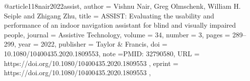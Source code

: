 @article{118nair2022assist,
author = {Vishnu Nair, Greg Olmschenk, William H. Seiple and Zhigang Zhu},
title = {ASSIST: Evaluating the usability and performance of an indoor navigation assistant for blind and visually impaired people},
journal = {Assistive Technology},
volume = {34},
number = {3},
pages = {289--299},
year = {2022},
publisher = {Taylor \& Francis},
doi = {10.1080/10400435.2020.1809553},
note ={PMID: 32790580},
URL = { https://doi.org/10.1080/10400435.2020.1809553 },
eprint = { https://doi.org/10.1080/10400435.2020.1809553 },
}